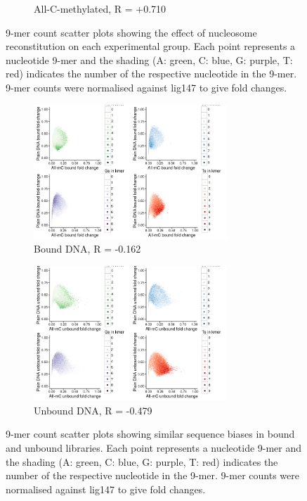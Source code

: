 \documentclass[parskip=full, numbers=noenddot]{scrbook}
\begin{document}
\begin{figure}[htbp]
\begin{subfigure}[htbp]{0.8\textwidth}
    \caption{All-C-methylated, R = +0.710}
    \label{fig:kmer_bound_all}
  \end{subfigure}
  \caption{9-mer count scatter plots showing the effect of nucleosome reconstitution on each experimental group.  Each point represents a nucleotide 9-mer and the shading (A: green, C: blue, G: purple, T: red) indicates the number of the respective nucleotide in the 9-mer.  9-mer counts were normalised against lig147 to give fold changes.}
  \label{fig:kmer_bound}
\end{figure}

\begin{figure}[htbp]
  \centering
  \begin{subfigure}[htbp]{0.8\textwidth}
    \centering
    \includegraphics[width=0.8\textwidth]{kmer_plainbXallb}
    \caption{Bound DNA, R = -0.162}
    \label{fig:kmer_bias_bound}
  \end{subfigure}
  \begin{subfigure}[htbp]{0.8\textwidth}
    \centering
    \includegraphics[width=0.8\textwidth]{kmer_plainubXallub}
    \caption{Unbound DNA, R = -0.479}
    \label{fig:kmer_bias_unbound}
  \end{subfigure}
  \caption{9-mer count scatter plots showing similar sequence biases in bound and unbound libraries.  Each point represents a nucleotide 9-mer and the shading (A: green, C: blue, G: purple, T: red) indicates the number of the respective nucleotide in the 9-mer.  9-mer counts were normalised against lig147 to give fold changes.}
  \label{fig:kmer_bias}
\end{figure}
\end{document}
